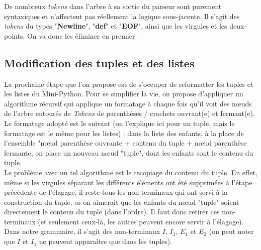 \documentclass[a4paper, 12pt]{report}
\begin{document}
De nombreux \textit{tokens} dans l'arbre à sa sortie du parseur sont purement syntaxiques et n'affectent pas réellement la logique sous-jacente. Il s'agit des \textit{tokens} du types "\textbf{Newline}", "\textbf{def}" et "\textbf{EOF}", ainsi que les virgules et les deux-points. On va donc les éliminer en premier.\\

\subsection{Modification des tuples et des listes}

La prochaine étape que l'on propose est de s'occuper de reformatter les tuples et les listes du Mini-Python. Pour se simplifier la vie, on propose d'appliquer un algorithme récursif qui applique un formatage à chaque fois qu'il voit des n{\oe}uds de l'arbre entourés de \textit{Tokens} de parenthèses / crochets ouvrant(e) et fermant(e).\\

Le formatage adopté est le suivant (on l'explique ici pour un tuple, mais le formatage est le même pour les listes) : dans la liste des enfants, à la place de l'ensemble "n{\oe}ud parenthèse ouvrante + contenu du tuple + n{\oe}ud parenthèse fermante, on place un nouveau n{\oe}ud "tuple", dont les enfants sont le contenu du tuple.\\

Le problème avec un tel algorithme est le recopiage du contenu du tuple. En effet, même si les virgules séparant les différents éléments ont été supprimées à l'étape précédente de l'élagage, il reste tous les non-terminaux qui ont servi à la construction du tuple, or on aimerait que les enfants du n{\oe}ud "tuple" soient directement le contenu du tuple (dans l'ordre). Il faut donc retirer ces non-terminaux (et seulement ceux-là, les autres peuvent encore servir à l'élagage). Dans notre grammaire, il s'agit des non-terminaux $I$, $I_1$, $E_1$ et $E_2$ (on peut noter que $I$ et $I_1$ ne peuvent apparaître que dans les tuples).\\
\end{document}
